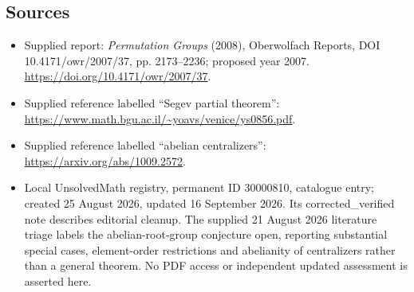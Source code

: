 \documentclass[11pt]{article}
\begin{document}
\subsection{Sources}
\begin{itemize}
\item Supplied report: \emph{Permutation Groups} (2008), Oberwolfach Reports, DOI 10.4171/owr/2007/37, pp. 2173--2236; proposed year 2007. \url{https://doi.org/10.4171/owr/2007/37}.
\item Supplied reference labelled ``Segev partial theorem'': \url{https://www.math.bgu.ac.il/~yoavs/venice/ys0856.pdf}.
\item Supplied reference labelled ``abelian centralizers'': \url{https://arxiv.org/abs/1009.2572}.
\item Local UnsolvedMath registry, permanent ID 30000810, catalogue entry; created 25 August 2026, updated 16 September 2026. Its corrected\_verified note describes editorial cleanup. The supplied 21 August 2026 literature triage labels the abelian-root-group conjecture open, reporting substantial special cases, element-order restrictions and abelianity of centralizers rather than a general theorem. No PDF access or independent updated assessment is asserted here.
\end{itemize}
\end{document}
